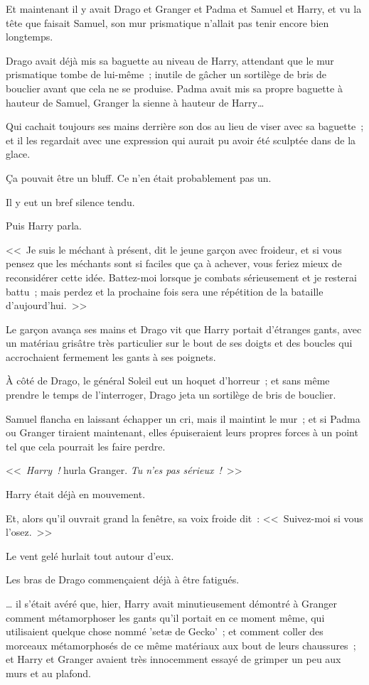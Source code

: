 Et maintenant il y avait Drago et Granger et Padma et Samuel et Harry, et vu la tête que faisait Samuel, son mur prismatique n'allait pas tenir encore bien longtemps.

Drago avait déjà mis sa baguette au niveau de Harry, attendant que le mur prismatique tombe de lui-même~; inutile de gâcher un sortilège de bris de bouclier avant que cela ne se produise. Padma avait mis sa propre baguette à hauteur de Samuel, Granger la sienne à hauteur de Harry…

Qui cachait toujours ses mains derrière son dos au lieu de viser avec sa baguette~; et il les regardait avec une expression qui aurait pu avoir été sculptée dans de la glace.

Ça pouvait être un bluff. Ce n'en était probablement pas un.

Il y eut un bref silence tendu.

Puis Harry parla.

<<~Je suis le méchant à présent, dit le jeune garçon avec froideur, et si vous pensez que les méchants sont si faciles que ça à achever, vous feriez mieux de reconsidérer cette idée. Battez-moi lorsque je combats sérieusement et je resterai battu~; mais perdez et la prochaine fois sera une répétition de la bataille d'aujourd'hui.~>>

Le garçon avança ses mains et Drago vit que Harry portait d'étranges gants, avec un matériau grisâtre très particulier sur le bout de ses doigts et des boucles qui accrochaient fermement les gants à ses poignets.

À côté de Drago, le général Soleil eut un hoquet d'horreur~; et sans même prendre le temps de l'interroger, Drago jeta un sortilège de bris de bouclier.

Samuel flancha en laissant échapper un cri, mais il maintint le mur~; et si Padma ou Granger tiraient maintenant, elles épuiseraient leurs propres forces à un point tel que cela pourrait les faire perdre.

<<~\emph{Harry~!} hurla Granger. \emph{Tu n'es pas sérieux~!}~>>

Harry était déjà en mouvement.

Et, alors qu'il ouvrait grand la fenêtre, sa voix froide dit~: <<~Suivez-moi si vous l'osez.~>>

\later

Le vent gelé hurlait tout autour d'eux.

Les bras de Drago commençaient déjà à être fatigués.

… il s'était avéré que, hier, Harry avait minutieusement démontré à Granger comment métamorphoser les gants qu'il portait en ce moment même, qui utilisaient quelque chose nommé 'setæ de Gecko'~; et comment coller des morceaux métamorphosés de ce même matériaux aux bout de leurs chaussures~; et Harry et Granger avaient très innocemment essayé de grimper un peu aux murs et au plafond.

